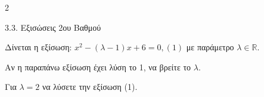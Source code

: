 \begin{ylh}{2}
    \item 3.3. Εξισώσεις 2ου Βαθμού
\end{ylh}
Δίνεται η εξίσωση: $x^{2} - (\lambda - 1)x + 6 = 0,(1)$ με παράμετρο $\lambda\mathbb{\in R.}$

\begin{alist}
\item Αν η παραπάνω εξίσωση έχει λύση το 1, να βρείτε το $\lambda.$
\item Για $\lambda = 2$ να λύσετε την εξίσωση (1).
\end{alist}

